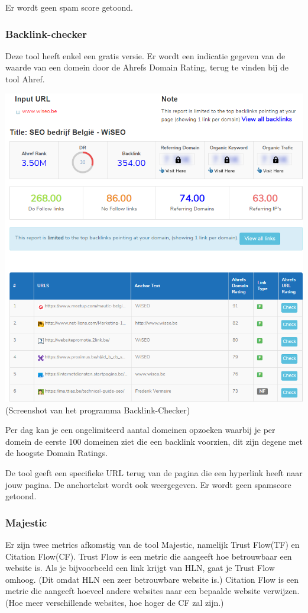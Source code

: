 Er wordt geen spam score getoond. 

\subsubsection{Backlink-checker}
\label{ch: Backlink-checker}

Deze tool heeft enkel een gratis versie. Er wordt een indicatie gegeven van de waarde van een domein door de Ahrefs Domain Rating, terug te vinden bij de tool Ahref.

\includegraphics[width=\linewidth]{Bachelorproef/bachelor/img/backlinkchecker.PNG}
(Screenshot van het programma Backlink-Checker)

Per dag kan je een ongelimiteerd aantal domeinen opzoeken waarbij je per domein de eerste 100 domeinen ziet die een backlink voorzien, dit zijn degene met de hoogste Domain Ratings.

De tool geeft een specifieke URL terug van de pagina die een hyperlink heeft naar jouw pagina. De anchortekst wordt ook weergegeven. Er wordt geen spamscore getoond. 

\subsubsection{Majestic}
\label{ch: Majestic}
Er zijn twee metrics afkomstig van de tool Majestic, namelijk Trust Flow(TF) en Citation Flow(CF). Trust Flow is een metric die aangeeft hoe betrouwbaar een website is. Als je bijvoorbeeld een link krijgt van HLN, gaat je Trust Flow omhoog. (Dit omdat HLN een zeer betrouwbare website is.) Citation Flow is een metric die aangeeft hoeveel andere websites naar een bepaalde website verwijzen. (Hoe meer verschillende websites, hoe hoger de CF zal zijn.)

